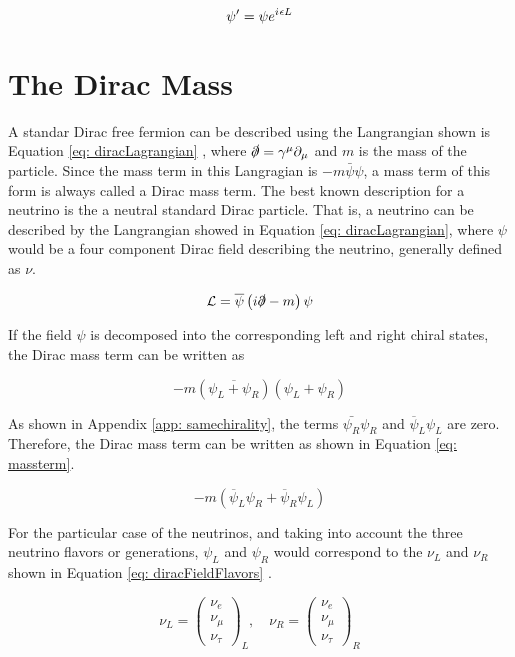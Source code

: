 \begin{equation}\label{eq: Ltransformation}
\psi^{\prime} = \psi e^{{i\mkern1mu} \epsilon L} 
\end{equation}

\section{The Dirac Mass}

A standar Dirac free fermion can be described using the Langrangian shown is Equation \ref{eq: diracLagrangian} \cite{NeutrinoMass}, where $\slashed{\partial} = \gamma^{\mu}\partial_{\mu}$ and $m$ is the mass of the particle. Since the mass term in this Langragian is $-m\bar{\psi}\psi$, a mass term of this form is always called a Dirac mass term. The best known description for a neutrino is the a neutral standard Dirac particle. That is, a neutrino can be described by the Langrangian showed in Equation \ref{eq: diracLagrangian}, where $\psi$ would be a four component Dirac field describing the neutrino, generally defined as $\nu$. 

\begin{equation}\label{eq: diracLagrangian}
 \mathcal{L} = \overline{\psi}\left(i\slashed{\partial} - m\right)\psi
\end{equation} 

If the field $\psi$ is decomposed into the corresponding left and right chiral states, the Dirac mass term can be written as 

$$-m(\overline{\psi_{L} + \psi_{R}})(\psi_{L} + \psi_{R})$$

As shown in Appendix \ref{app: samechirality}, the terms $\bar{\psi_{R}}\psi_{R}$ and $\overline{\psi}_{L}\psi_{L}$ are zero. Therefore, the Dirac mass term can be written as shown in Equation \ref{eq: massterm}. 

\begin{equation} \label{eq: massterm}
-m \left(\overline{\psi}_{L}\psi_{R} + \overline{\psi}_{R}\psi_{L}\right)
\end{equation}

For the particular case of the neutrinos, and taking into account the three neutrino flavors or generations, $\psi_{L}$ and $\psi_{R}$ would correspond to the $\nu_{L}$ and $\nu_{R}$ shown in Equation \ref{eq: diracFieldFlavors} \cite{NeutrinoMass}.

\begin{equation}\label{eq: diracFieldFlavors}
\nu_{L} = \begin{pmatrix} \nu_{e}\\ \nu_{\mu} \\ \nu_{\tau} \end{pmatrix}_{L} , \quad \nu_{R} = \begin{pmatrix} \nu_{e}\\ \nu_{\mu} \\ \nu_{\tau} \end{pmatrix}_{R}
\end{equation}

